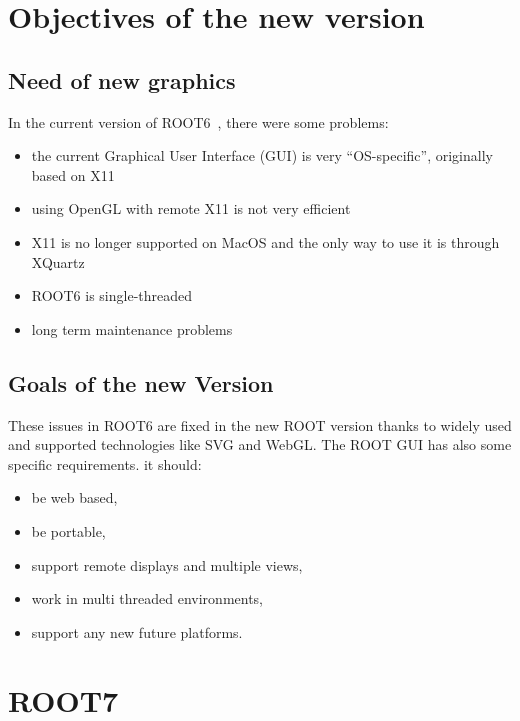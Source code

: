 \documentclass[a4paper]{jpconf}
\begin{document}
\section{Objectives of the new version}

\subsection{Need of new graphics}
In the current version of ROOT6~\cite{root6}, there were some problems:
\begin{itemize}
  \item the current Graphical User Interface (GUI) is very ``OS-specific'', originally based on X11
  \item using OpenGL with remote X11 is not very efficient
  \item X11 is no longer supported on MacOS and the only way to use it is through XQuartz~\cite{x11}
  \item ROOT6 is single-threaded
  \item long term maintenance problems
\end{itemize}

\subsection{Goals of the new Version}

These issues in ROOT6 are fixed in the new ROOT version thanks to widely used and
supported technologies like SVG and WebGL. The ROOT GUI has also some specific
requirements. it should:
\begin{itemize}
  \item  be web based,
  \item be portable,
  \item support remote displays and multiple views,
  \item work in multi threaded environments,
  \item support any new future platforms.
\end{itemize}

\section{ROOT7}
\end{document}
